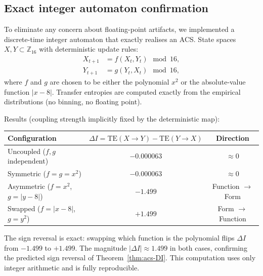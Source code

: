\documentclass[11pt,a4paper]{article}
\theoremstyle{plain}
\theoremstyle{definition}
\theoremstyle{remark}
\newcommand{\TE}{\mathrm{TE}}
\begin{document}
\subsection{Exact integer automaton confirmation}

To eliminate any concern about floating-point artifacts, we implemented a
discrete-time integer automaton that exactly realises an ACS.  State spaces
$X,Y \subset \mathbb{Z}_{16}$ with deterministic update rules:
\begin{align}
  X_{t+1} &= f(X_t, Y_t) \mod 16,\\
  Y_{t+1} &= g(Y_t, X_t) \mod 16,
\end{align}
where $f$ and $g$ are chosen to be either the polynomial $x^2$ or the
absolute‑value function $|x-8|$.  Transfer entropies are computed exactly
from the empirical distributions (no binning, no floating point).

Results (coupling strength implicitly fixed by the deterministic map):

\begin{center}
\begin{tabular}{lcc}
\toprule
Configuration & $\Delta I = \TE(X{\to}Y)-\TE(Y{\to}X)$ & Direction \\
\midrule
Uncoupled ($f,g$ independent)      & $-0.000063$ & $\approx 0$ \\
Symmetric ($f=g=x^2$)               & $-0.000063$ & $\approx 0$ \\
Asymmetric ($f=x^2$, $g=|y-8|$)    & $-1.499$    & Function $\to$ Form \\
Swapped ($f=|x-8|$, $g=y^2$)       & $+1.499$    & Form $\to$ Function \\
\bottomrule
\end{tabular}
\end{center}

The sign reversal is exact: swapping which function is the polynomial flips
$\Delta I$ from $-1.499$ to $+1.499$.  The magnitude $|\Delta I| \approx 1.499$
in both cases, confirming the predicted sign reversal of Theorem~\ref{thm:acs-DI}.
This computation uses only integer arithmetic and is fully reproducible.
\end{document}
